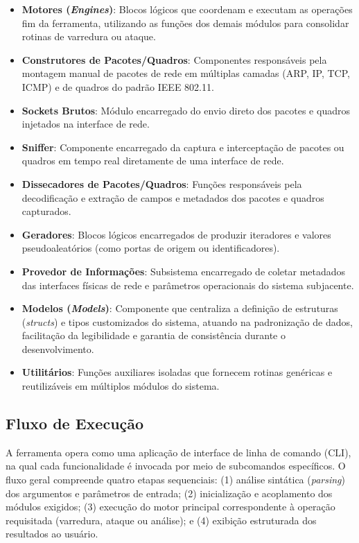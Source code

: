\begin{itemize}
    \item \textbf{Motores (\textit{Engines})}: Blocos lógicos que coordenam e executam as operações fim da ferramenta, utilizando as funções dos demais módulos para consolidar rotinas de varredura ou ataque.
    
    \item \textbf{Construtores de Pacotes/Quadros}: Componentes responsáveis pela montagem manual de pacotes de rede em múltiplas camadas (ARP, IP, TCP, ICMP) e de quadros do padrão IEEE 802.11.
    
    \item \textbf{Sockets Brutos}: Módulo encarregado do envio direto dos pacotes e quadros injetados na interface de rede.
    
    \item \textbf{Sniffer}: Componente encarregado da captura e interceptação de pacotes ou quadros em tempo real diretamente de uma interface de rede.
    
    \item \textbf{Dissecadores de Pacotes/Quadros}: Funções responsáveis pela decodificação e extração de campos e metadados dos pacotes e quadros capturados.
    
    \item \textbf{Geradores}: Blocos lógicos encarregados de produzir iteradores e valores pseudoaleatórios (como portas de origem ou identificadores).
    
    \item \textbf{Provedor de Informações}: Subsistema encarregado de coletar metadados das interfaces físicas de rede e parâmetros operacionais do sistema subjacente.
    
    \item \textbf{Modelos (\textit{Models})}: Componente que centraliza a definição de estruturas (\textit{structs}) e tipos customizados do sistema, atuando na padronização de dados, facilitação da legibilidade e garantia de consistência durante o desenvolvimento.
    
    \item \textbf{Utilitários}: Funções auxiliares isoladas que fornecem rotinas genéricas e reutilizáveis em múltiplos módulos do sistema.
\end{itemize}

\subsection{Fluxo de Execução}
A ferramenta opera como uma aplicação de interface de linha de comando (CLI), na qual cada funcionalidade é invocada por meio de subcomandos específicos. O fluxo geral compreende quatro etapas sequenciais: (1) análise sintática (\textit{parsing}) dos argumentos e parâmetros de entrada; (2) inicialização e acoplamento dos módulos exigidos; (3) execução do motor principal correspondente à operação requisitada (varredura, ataque ou análise); e (4) exibição estruturada dos resultados ao usuário.
